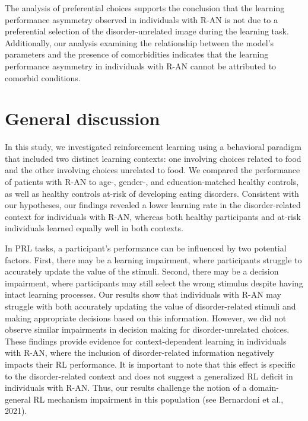 \documentclass[
  man,floatsintext]{apa6}
\begin{document}
The analysis of preferential choices supports the conclusion that the learning performance asymmetry observed in individuals with R-AN is not due to a preferential selection of the disorder-unrelated image during the learning task. Additionally, our analysis examining the relationship between the model's parameters and the presence of comorbidities indicates that the learning performance asymmetry in individuals with R-AN cannot be attributed to comorbid conditions.

\hypertarget{general-discussion}{%
\section{General discussion}\label{general-discussion}}

In this study, we investigated reinforcement learning using a behavioral paradigm that included two distinct learning contexts: one involving choices related to food and the other involving choices unrelated to food. We compared the performance of patients with R-AN to age-, gender-, and education-matched healthy controls, as well as healthy controls at-risk of developing eating disorders. Consistent with our hypotheses, our findings revealed a lower learning rate in the disorder-related context for individuals with R-AN, whereas both healthy participants and at-risk individuals learned equally well in both contexts.

In PRL tasks, a participant's performance can be influenced by two potential factors. First, there may be a learning impairment, where participants struggle to accurately update the value of the stimuli. Second, there may be a decision impairment, where participants may still select the wrong stimulus despite having intact learning processes. Our results show that individuals with R-AN may struggle with both accurately updating the value of disorder-related stimuli and making appropriate decisions based on this information. However, we did not observe similar impairments in decision making for disorder-unrelated choices. These findings provide evidence for context-dependent learning in individuals with R-AN, where the inclusion of disorder-related information negatively impacts their RL performance. It is important to note that this effect is specific to the disorder-related context and does not suggest a generalized RL deficit in individuals with R-AN. Thus, our results challenge the notion of a domain-general RL mechanism impairment in this population (see Bernardoni et al., 2021).
\end{document}
